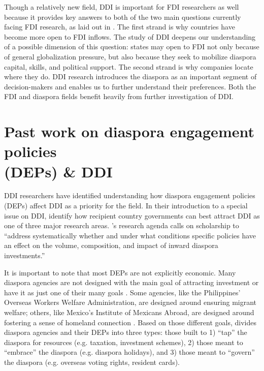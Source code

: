 \documentclass[doublespace,nopageskip]{UVAthesis}
\begin{document}
Though a relatively new field, DDI is important for FDI researchers as well because it provides key answers to both of the two main questions currently facing FDI research, as laid out in \citep{pandya_political_2016}. The first strand is why countries have become more open to FDI inflows. The study of DDI deepens our understanding of a possible dimension of this question: states may open to FDI not only because of general globalization pressure, but also because they seek to mobilize diaspora capital, skills, and political support. The second strand is why companies locate where they do. DDI research introduces the diaspora as an important segment of decision-makers and enables us to further understand their preferences. Both the FDI and diaspora fields benefit heavily from further investigation of DDI.

\section{Past work on diaspora engagement policies \\ (DEPs) \& DDI} \label{ss: past dep/ddi work}

DDI researchers have identified understanding how diaspora engagement policies (DEPs) affect DDI as a priority for the field. In their introduction to a special issue on DDI, \citet{alam_iqbal_introduction_2024} identify how recipient country governments can best attract DDI as one of three major research areas. \citet{naujoks_transnational_2022}'s research agenda calls on scholarship to ``address systematically whether and under what conditions specific policies have an effect on the volume, composition, and impact of inward diaspora investments.''

It is important to note that most DEPs are not explicitly economic. Many diaspora agencies are not designed with the main goal of attracting investment or have it as just one of their many goals \citep{gamlen_explaining_2021}. Some agencies, like the Philippines' Overseas Workers Welfare Administration, are designed around ensuring migrant welfare; others, like Mexico's Institute of Mexicans Abroad, are designed around fostering a sense of homeland connection \citep{orbeta_institutions_2009, delano_alonso_shifting_2018}. Based on those different goals, \citep{gamlen_human_2019} divides diaspora agencies and their DEPs into three types: those built to 1) ``tap'' the diaspora for resources (e.g. taxation, investment schemes), 2) those meant to ``embrace'' the diaspora (e.g. diaspora holidays), and 3) those meant to ``govern'' the diaspora (e.g. overseas voting rights, resident cards).
\end{document}
